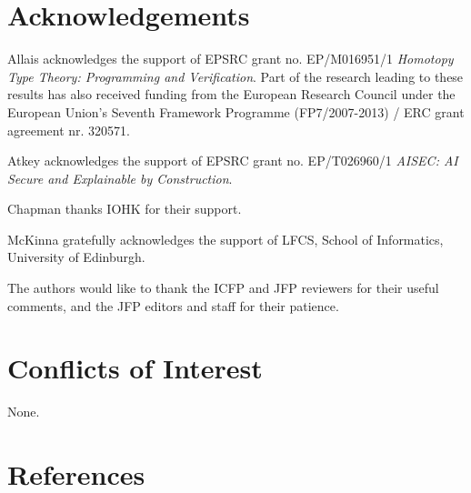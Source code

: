\documentclass{jfp}
\begin{document}
\maketitle




\section*{Acknowledgements}

Allais acknowledges the support of EPSRC grant no. EP/M016951/1
\emph{Homotopy Type Theory: Programming and Verification}.
Part of the research leading to these results has also received funding from
the European Research Council under the European Union’s Seventh Framework
Programme (FP7/2007-2013) / ERC grant agreement nr. 320571.

Atkey acknowledges the support of EPSRC grant no. EP/T026960/1
\emph{AISEC: AI Secure and Explainable by Construction}.

Chapman thanks IOHK for their support.

McKinna gratefully acknowledges the support of LFCS, School of
Informatics, University of Edinburgh.

The authors would like to thank the ICFP and JFP reviewers for their
useful comments, and the JFP editors and staff for their patience.

\section*{Conflicts of Interest}

None.


\renewcommand{\bibsection}{}
\section*{References}



\label{lastpage01}
\end{document}
